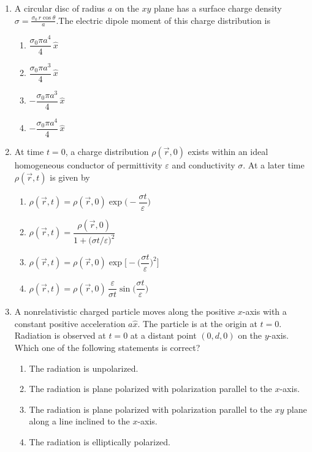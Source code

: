\documentclass[journal,12pt,onecolumn]{IEEEtran}
\theoremstyle{remark}
\begin{document}
\begin{enumerate}
\begin{multicols}{2}
\begin{enumerate}
\end{enumerate}
\end{multicols}
\item A circular disc of radius $a$ on the $xy$ plane has a surface charge density $\sigma = \frac{\sigma_0\, r \cos\theta}{a}$.The electric dipole moment of this charge distribution is
\hfill{}
\begin{multicols}{4}
\begin{enumerate}
    \item $\dfrac{\sigma_0 \pi a^4}{4}\,\hat{x}$
    \item $\dfrac{\sigma_0 \pi a^3}{4}\,\hat{x}$
    \item $-\dfrac{\sigma_0 \pi a^3}{4}\,\hat{x}$
    \item $-\dfrac{\sigma_0 \pi a^4}{4}\,\hat{x}$
\end{enumerate}
\end{multicols}
\item At time $t=0$, a charge distribution $\rho(\vec{r},0)$ exists within an ideal homogeneous conductor of permittivity $\varepsilon$ and conductivity $\sigma$. At a later time $\rho(\vec{r},t)$ is given by
\hfill{}
\begin{multicols}{2}
\begin{enumerate}
    \item $\rho(\vec{r},t)=\rho(\vec{r},0)\exp\biggl(-\dfrac{\sigma t}{\varepsilon}\biggr)$
    \item $\rho(\vec{r},t)=\dfrac{\rho(\vec{r},0)}{1+\bigl({\sigma t}/{\varepsilon}\bigr)^2}$
    \item $\rho(\vec{r},t)=\rho(\vec{r},0)\exp\biggl[-\biggl(\dfrac{\sigma t}{\varepsilon}\biggr)^2\biggr]$
    \item $\rho(\vec{r},t)=\rho(\vec{r},0)\,\dfrac{\varepsilon}{\sigma t}\sin\!\biggl(\dfrac{\sigma t}{\varepsilon}\biggr)$
\end{enumerate}
\end{multicols}

\item A nonrelativistic charged particle moves along the positive $x$-axis with a constant positive acceleration $a\hat{x}$. The particle is at the origin at $t=0$. Radiation is observed at $t=0$ at a distant point $(0,d,0)$ on the $y$-axis. Which one of the following statements is correct?
\hfill{}
\begin{enumerate}
    \item The radiation is unpolarized.
    \item The radiation is plane polarized with polarization parallel to the $x$-axis.
    \item The radiation is plane polarized with polarization parallel to the $xy$ plane along a line inclined to the $x$-axis.
    \item The radiation is elliptically polarized.
\end{enumerate}



\end{enumerate}
\end{document}
